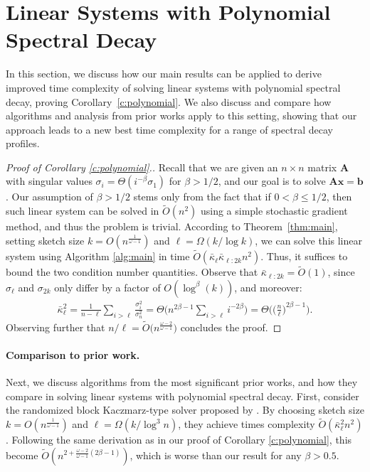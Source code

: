 \documentclass[11pt]{article}
\def\x{{\mathbf x}}
\def\b{{\mathbf b}}
\def\A{{\mathbf A}}
\begin{document}
\section{Linear Systems with Polynomial Spectral Decay}
\label{a:polynomial}
In this section, we discuss how our main results can be applied to derive improved time complexity of solving linear systems with polynomial spectral decay, proving Corollary~\ref{c:polynomial}.  We also discuss and compare how algorithms and analysis from prior works apply to this setting, showing that our approach leads to a new best time complexity for a range of spectral decay profiles.

\begin{proof}[Proof of Corollary \ref{c:polynomial}.]
Recall that we are given an $n\times n$ matrix $\A$ with singular values $\sigma_i=\Theta(i^{-\beta}\sigma_1)$ for $\beta> 1/2$, and our goal is to solve $\A\x=\b$. Our assumption of $\beta>1/2$ stems only from the fact that if $0<\beta\leq 1/2$, then such linear system can be solved in $\tilde O(n^2)$  using a simple stochastic gradient method, and thus the problem is trivial. According to Theorem~\ref{thm:main}, setting sketch size $k=O(n^{\frac1{\omega-1}})$ and $\ell = \Omega(k/\log k)$, we can solve this linear system using Algorithm \ref{alg:main} in time $\tilde O(\bar\kappa_\ell\bar\kappa_{\ell:2k}n^2)$. Thus, it suffices to bound the two condition number quantities. Observe that $\bar\kappa_{\ell:2k} = \tilde O(1)$, since $\sigma_\ell$ and $\sigma_{2k}$ only differ by a factor of $O(\log^\beta(k))$, and moreover:
\begin{align*}
    \bar\kappa_\ell^2 = \frac1{n-\ell}\sum_{i>\ell}\frac{\sigma_i^2}{\sigma_n^2}=\Theta \bigg( n^{2\beta-1}\sum_{i>\ell}i^{-2\beta}\bigg)=\Theta\bigg(\Big(\frac n\ell\Big)^{2\beta-1}\bigg).
\end{align*}
Observing further that $n/\ell = \tilde O\big(n^{\frac{\omega-2}{\omega-1}}\big)$ concludes the proof. 
\end{proof}

\paragraph{Comparison to prior work.}
Next, we discuss algorithms from the most significant prior works, and how they compare in solving linear systems with polynomial spectral decay. First, consider the randomized block Kaczmarz-type solver proposed by \cite{derezinski2023solving}. By choosing sketch size $k=O(n^{\frac1{\omega-1}})$ and $\ell = \Omega(k/\log^3 n)$, they achieve times complexity $\tilde O(\bar\kappa_\ell^2 n^2)$. Following the same derivation as in our proof of Corollary \ref{c:polynomial}, this become $\tilde O(n^{2+\frac{\omega-2}{\omega-1}(2\beta-1)})$, which is worse than our result for any $\beta>0.5$.
\end{document}
